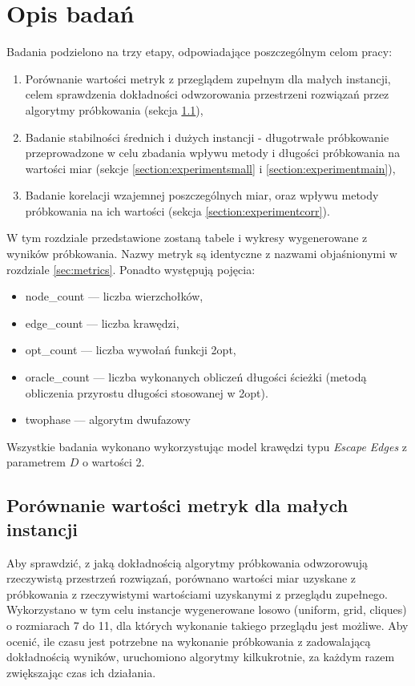 \section{Opis badań}

Badania podzielono na trzy etapy, odpowiadające poszczególnym celom pracy:

\begin{enumerate}
    \item Porównanie wartości metryk z przeglądem zupełnym dla małych instancji, celem sprawdzenia dokładności odwzorowania przestrzeni rozwiązań przez algorytmy próbkowania (sekcja \ref{section:experimentcomp}),
    \item Badanie stabilności średnich i dużych instancji - długotrwałe próbkowanie przeprowadzone w celu zbadania wpływu metody i długości próbkowania na wartości miar (sekcje \ref{section:experimentsmall} i \ref{section:experimentmain}),
    \item Badanie korelacji wzajemnej poszczególnych miar, oraz wpływu metody próbkowania na ich wartości (sekcja \ref{section:experimentcorr}).
\end{enumerate}

W tym rozdziale przedstawione zostaną tabele i wykresy wygenerowane z wyników próbkowania.
Nazwy metryk są identyczne z nazwami objaśnionymi w rozdziale \ref{sec:metrics}.
Ponadto występują pojęcia:

\begin{itemize}
    \item node\_count --- liczba wierzchołków,
    \item edge\_count --- liczba krawędzi,
    \item opt\_count --- liczba wywołań funkcji 2opt,
    \item oracle\_count --- liczba wykonanych obliczeń długości ścieżki (metodą obliczenia przyrostu długości stosowanej w 2opt).
    \item twophase --- algorytm dwufazowy
\end{itemize}

Wszystkie badania wykonano wykorzystując model krawędzi typu \textit{Escape Edges} z parametrem $D$ o wartości 2.

\subsection{Porównanie wartości metryk dla małych instancji} \label{section:experimentcomp}
Aby sprawdzić, z jaką dokładnością algorytmy próbkowania odwzorowują rzeczywistą przestrzeń rozwiązań,
porównano wartości miar uzyskane z próbkowania z rzeczywistymi wartościami uzyskanymi z przeglądu zupełnego.
Wykorzystano w tym celu instancje wygenerowane losowo (uniform, grid, cliques) o rozmiarach 7 do 11, dla których wykonanie takiego przeglądu jest możliwe.
Aby ocenić, ile czasu jest potrzebne na wykonanie próbkowania z zadowalającą dokładnością wyników, uruchomiono algorytmy kilkukrotnie,
za każdym razem zwiększając czas ich działania.

